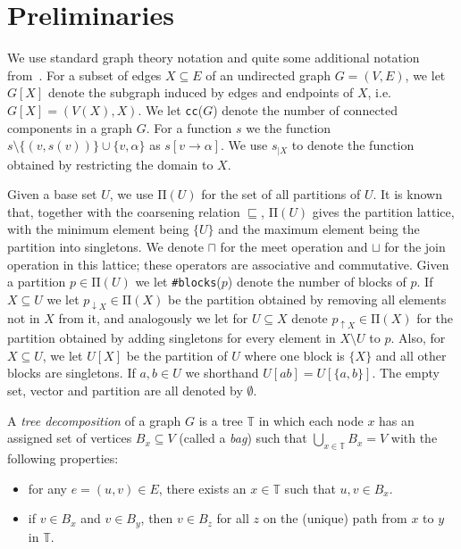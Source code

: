 \documentclass{llncs}
\begin{document}
\section{Preliminaries}\label{prelim}
We use standard graph theory notation and quite some additional notation from~\cite{BodlaenderCKN12}. 
For a subset of edges $X \subseteq E$ of an undirected graph $G = (V,E)$,
we let $G[X]$ denote the subgraph induced by edges and endpoints of $X$, i.e. $G[X]=(V(X),X)$. We let \texttt{cc}($G$) denote the number of connected components in a graph $G$.
For a function $s$ we the function $s\setminus\{(v,s(v))\}\cup \{v,\alpha\}$ as $s[v \rightarrow \alpha]$. We use $s_{|X}$ to denote the function obtained by restricting the domain to $X$.

Given a base set $U$, we use $\mathrm{\Pi}(U)$ for the set of all partitions of $U$. It is known that, together with the coarsening relation $\sqsubseteq$, $\mathrm{\Pi}(U)$ gives the partition lattice, with the minimum element being $\{U\}$ and the maximum element being the partition into singletons. We denote $\sqcap$ for the meet operation and $\sqcup$ for the join operation in this lattice; these operators are associative and commutative. Given a partition $p \in \mathrm{\Pi}(U)$ we let \texttt{\#blocks}($p$) denote the number of blocks of $p$. If $X \subseteq U$ we let $p_{\downarrow X}\in\mathrm{\Pi}(X)$ be the partition obtained by removing all elements not in $X$ from it, and analogously we let for $U\subseteq X$ denote $p_{\uparrow X}\in \mathrm{\Pi}(X)$ for the partition obtained by adding singletons for every element in $X \setminus U$ to $p$. Also, for $X\subseteq U$, we let $U[X]$ be the partition of $U$ where one block is $\{X\}$ and all other blocks are singletons. If $a, b \in U$ we shorthand $U[ab] = U[\{a,b\}]$. The empty set, vector and partition are all denoted by $\emptyset$. 

\begin{definition}
A \emph{tree decomposition}  of a graph $G$ is a tree $\mathbb{T}$ in which each node $x$ has an assigned set of vertices $B_{x} \subseteq V$ (called a \emph{bag}) such that $\bigcup_{x\in\mathbb{T}}B_{x} = V$ with the following properties:
\begin{itemize}
\item for any $e = (u,v) \in E$, there exists an $x\in\mathbb{T}$ such that $u,v \in B_{x}$.
\item if $v \in B_{x}$ and $v \in B_{y}$, then $v \in B_{z}$ for all $z$ on the (unique) path from $x$ to $y$ in $\mathbb{T}$.
\end{itemize}
\end{definition}
\end{document}
